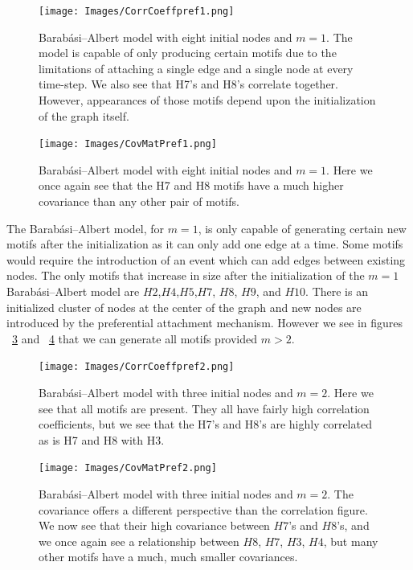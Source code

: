 \begin{figure}
    \texttt{[image: Images/CorrCoeffpref1.png]}\
    \centering
    \caption{Barabási–Albert model with eight initial nodes and $m=1$. The model
     is capable of only producing certain motifs due to the limitations of 
    attaching a single edge and a single node at every time-step. We also see that 
    H7's and H8's correlate together. However, appearances of those motifs depend upon the initialization
     of the graph itself.}
     \label{fig:BAcorr1}
\end{figure}

\begin{figure}
    \texttt{[image: Images/CovMatPref1.png]}\
    \centering
    \caption{Barabási–Albert model with eight initial nodes and $m =1$. Here we once again see that 
    the H7 and H8 motifs have a much higher covariance than any other pair of motifs.}
    \label{fig:BAcov1}
\end{figure}


The Barabási–Albert model, for $m=1$, is only capable of generating certain new motifs after the initialization as 
it can only add one edge at a time. Some motifs would require the introduction of an event
which can add edges between existing nodes. The only motifs that increase in size after the initialization
 of the $m=1$ Barabási–Albert model are $H2$,$H4$,$H5$,$H7$, $H8$, $H9$, and $H10$. There is an initialized cluster
of nodes at the center of the graph and new nodes are introduced by the
preferential attachment mechanism. However we see in figures  ~\ref{fig:BA2corr} and ~\ref{fig:BA2coeff} that we can generate all motifs provided
$m>2$.


\begin{figure}
    \texttt{[image: Images/CorrCoeffpref2.png]}\
    \centering
    \caption{Barabási–Albert model with three initial nodes and $m=2$. Here we see that all motifs 
    are present. They all have fairly high correlation coefficients, but we see that the H7's and
    H8's are highly correlated as is H7 and H8 with H3.}
    \label{fig:BA2corr}
\end{figure}

\begin{figure}
    \texttt{[image: Images/CovMatPref2.png]}\
    \centering
    \caption{Barabási–Albert model with three initial nodes and $m=2$. The covariance
    offers a different perspective than the correlation figure. We now see that 
    their high covariance between $H7$'s and $H8$'s, and we once again see a relationship
    between $H8$, $H7$, $H3$, $H4$, but many other motifs have a much, much smaller covariances.}
    \label{fig:BA2coeff}
\end{figure}

